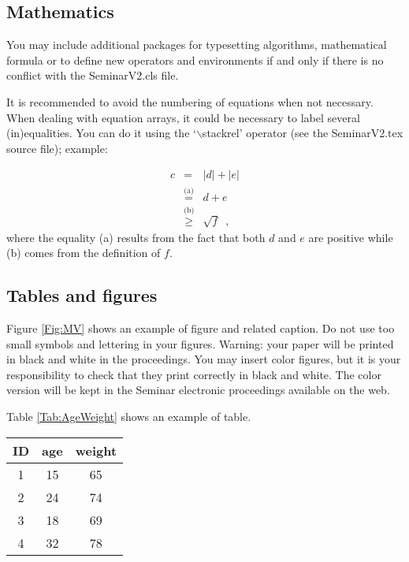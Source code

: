 \documentclass{SeminarV2}
\begin{document}
\subsection{Mathematics}
You may include additional packages for typesetting
algorithms, mathematical formula or to define new operators and environments
if and only if there is no conflict with the SeminarV2.cls
file.

It is recommended to avoid the numbering of equations when not
necessary. When dealing with equation arrays, it could be
necessary to label several (in)equalities. You can do it using the
`$\backslash$stackrel' operator (see the SeminarV2.tex source file);
example:

\begin{eqnarray}
c&=&|d|+|e|\nonumber\\
&\stackrel{\text{(a)}}{=}&d+e\nonumber\\
&\stackrel{\text{(b)}}{\geq}&\sqrt{f}\enspace,
\end{eqnarray}
\noindent where the equality (a) results from the fact that both
$d$ and $e$ are positive while (b) comes from the definition of
$f$.

\subsection{Tables and figures}

Figure \ref{Fig:MV} shows an example of figure and related
caption.  Do not use too small symbols and lettering in your
figures.  Warning: your paper will be printed in black and white
in the proceedings.  You may insert color figures, but it is your
responsibility to check that they print correctly in black and
white.  The color version will be kept in the Seminar electronic
proceedings available on the web.

\begin{figure}[ht]
\centering
\end{figure}

Table \ref{Tab:AgeWeight} shows an example of table.

\begin{table}[h!]
  \centering
  \begin{tabular}{|c|c|c|}
    \hline
    ID & age & weight \\
    \hline
    1& 15 & 65 \\
    2& 24 & 74\\
    3& 18 & 69 \\
    4& 32 & 78 \\
    \hline
  \end{tabular}
\end{table}
\end{document}

